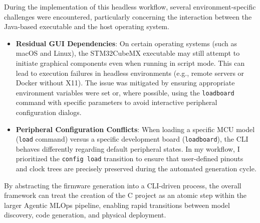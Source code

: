 During the implementation of this headless workflow, several environment-specific challenges were encountered, particularly concerning the interaction between the Java-based executable and the host operating system.

\begin{itemize}
    \item \textbf{Residual GUI Dependencies}: On certain operating systems (such as macOS and Linux), the STM32CubeMX executable may still attempt to initiate graphical components even when running in script mode. This can lead to execution failures in headless environments (e.g., remote servers or Docker without X11). The issue was mitigated by ensuring appropriate environment variables were set or, where possible, using the \texttt{loadboard} command with specific parameters to avoid interactive peripheral configuration dialogs.
    
    \item \textbf{Peripheral Configuration Conflicts}: When loading a specific MCU model (\texttt{load} command) versus a specific development board (\texttt{loadboard}), the CLI behaves differently regarding default peripheral states. In my workflow, I prioritized the \texttt{config load} transition to ensure that user-defined pinouts and clock trees are precisely preserved during the automated generation cycle.
\end{itemize}

By abstracting the firmware generation into a CLI-driven process, the overall framework can treat the creation of the C project as an atomic step within the larger Agentic MLOps pipeline, enabling rapid transitions between model discovery, code generation, and physical deployment.
